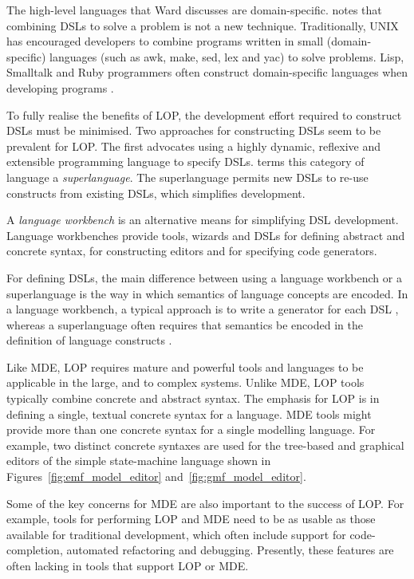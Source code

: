 The high-level languages that Ward discusses are domain-specific. \cite{fowler10dsls} notes that combining DSLs to solve a problem is not a new technique. Traditionally, UNIX has encouraged developers to combine programs written in small (domain-specific) languages (such as awk, make, sed, lex and yac) to solve problems. Lisp, Smalltalk and Ruby programmers often construct domain-specific languages when developing programs \cite{graham93lisp}.

To fully realise the benefits of LOP, the development effort required to construct DSLs must be minimised. Two approaches for constructing DSLs seem to be prevalent for LOP. The first advocates using a highly dynamic, reflexive and extensible programming language to specify DSLs. \cite{clark08superlanguages} terms this category of language a \textit{superlanguage}. The superlanguage permits new DSLs to re-use constructs from existing DSLs, which simplifies development.

A \textit{language workbench} \cite[ch. 9]{fowler10dsls} is an alternative means for simplifying DSL development. Language workbenches provide tools, wizards and DSLs for defining abstract and concrete syntax, for constructing editors and for specifying code generators.

For defining DSLs, the main difference between using a language workbench or a superlanguage is the way in which semantics of language concepts are encoded. In a language workbench, a typical approach is to write a generator for each DSL \cite{fowler10dsls}, whereas a superlanguage often requires that semantics be encoded in the definition of language constructs \cite{clark08superlanguages}.

Like MDE, LOP requires mature and powerful tools and languages to be applicable in the large, and to complex systems. Unlike MDE, LOP tools typically combine concrete and abstract syntax. The emphasis for LOP is in defining a single, textual concrete syntax for a language. MDE tools might provide more than one concrete syntax for a single modelling language. For example, two distinct concrete syntaxes are used for the tree-based and graphical editors of the simple state-machine language shown in Figures~\ref{fig:emf_model_editor} and~\ref{fig:gmf_model_editor}.

Some of the key concerns for MDE are also important to the success of LOP. For example, tools for performing LOP and MDE need to be as usable as those available for traditional development, which often include support for code-completion, automated refactoring and debugging. Presently, these features are often lacking in tools that support LOP or MDE.

